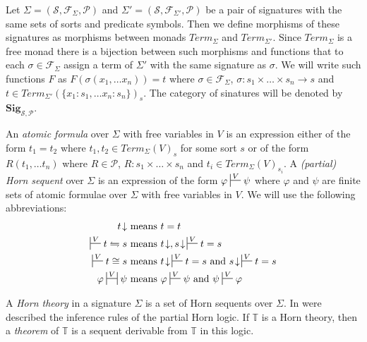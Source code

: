 \documentclass{amsart}
\theoremstyle{definition}
\theoremstyle{remark}
\newcommand{\cat}[1]{\mathbf{#1}}
\newcommand{\Sig}{\cat{Sig}}
\numberwithin{figure}{section}
\begin{document}
Let $\Sigma = (\mathcal{S}, \mathcal{F}_\Sigma, \mathcal{P})$ and $\Sigma' = (\mathcal{S}, \mathcal{F}_{\Sigma'}, \mathcal{P})$ be a pair of signatures with the same sets of sorts and predicate symbols.
Then we define morphisms of these signatures as morphisms between monads $Term_\Sigma$ and $Term_{\Sigma'}$.
Since $Term_\Sigma$ is a free monad there is a bijection between such morphisms and functions that to each $\sigma \in \mathcal{F}_\Sigma$ assign a term of $\Sigma'$ with the same signature as $\sigma$.
We will write such functions $F$ as $F(\sigma(x_1, \ldots x_n)) = t$ where $\sigma \in \mathcal{F}_\Sigma$, $\sigma : s_1 \times \ldots \times s_n \to s$ and $t \in Term_{\Sigma'}(\{ x_1 : s_1, \ldots x_n : s_n \})_s$.
The category of sinatures will be denoted by $\Sig_{\mathcal{S},\mathcal{P}}$.

An \emph{atomic formula} over $\Sigma$ with free variables in $V$ is an expression either of the form $t_1 = t_2$ where $t_1, t_2 \in Term_\Sigma(V)_s$ for some sort $s$ or of the form $R(t_1, \ldots t_n)$ where $R \in \mathcal{P}$, $R : s_1 \times \ldots \times s_n$ and $t_i \in Term_\Sigma(V)_{s_i}$.
A \emph{(partial) Horn sequent} over $\Sigma$ is an expression of the form $\varphi \sststile{}{V} \psi$ where $\varphi$ and $\psi$ are finite sets of atomic formulae over $\Sigma$ with free variables in $V$.
We will use the following abbreviations:
\begin{align*}
t\!\downarrow & \text{ means } t = t \\
\sststile{}{V} t \leftrightharpoons s & \text{ means } t\!\downarrow, s\!\downarrow\,\sststile{}{V} t = s \\
\sststile{}{V} t \cong s & \text{ means } t\!\downarrow\,\sststile{}{V} t = s \text{ and } s\!\downarrow\,\sststile{}{V} t = s \\
\varphi \ssststile{}{V} \psi & \text{ means } \varphi \sststile{}{V} \psi \text{ and } \psi \sststile{}{V} \varphi
\end{align*}

A \emph{Horn theory} in a signature $\Sigma$ is a set of Horn sequents over $\Sigma$.
In \cite{PHT} were described the inference rules of the partial Horn logic.
If $\mathbb{T}$ is a Horn theory, then a \emph{theorem} of $\mathbb{T}$ is a sequent derivable from $\mathbb{T}$ in this logic.
\end{document}
